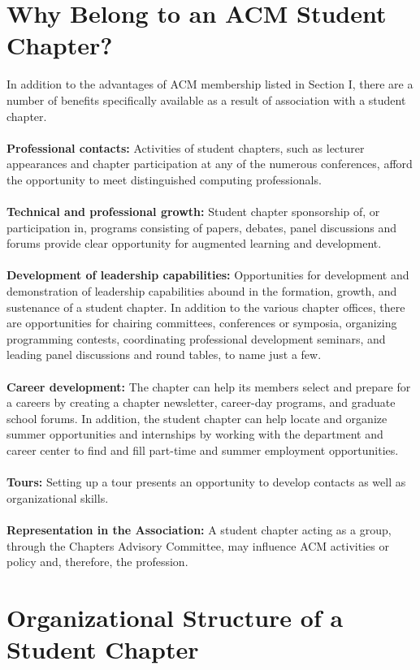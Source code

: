 \section{Why Belong to an ACM Student Chapter?}
\label{sec:sec05}
In addition to the advantages of ACM membership listed in Section I, there are
a number of benefits specifically available as a result of association with a
student chapter.\\
\\
\textbf{Professional contacts:} Activities of student chapters, such as lecturer
appearances and chapter participation at any of the numerous conferences, afford
the opportunity to meet distinguished computing professionals.\\
\\
\textbf{Technical and professional growth:} Student chapter sponsorship of, or
participation in, programs consisting of papers, debates, panel discussions and
forums provide clear opportunity for augmented learning and development.\\
\\
\textbf{Development of leadership capabilities:} Opportunities for development
and demonstration of leadership capabilities abound in the formation, growth,
and sustenance of a student chapter. In addition to the various chapter offices,
there are opportunities for chairing committees, conferences or symposia,
organizing programming contests, coordinating professional development seminars,
and leading panel discussions and round tables, to name just a few.\\
\\
\textbf{Career development:} The chapter can help its members select and prepare
for a careers by creating a chapter newsletter, career-day programs, and graduate
school forums. In addition, the student chapter can help locate and organize
summer opportunities and internships by working with the department and career
center to find and fill part-time and summer employment opportunities.\\
\\
\textbf{Tours:} Setting up a tour presents an opportunity to develop contacts
as well as organizational skills.\\
\\
\textbf{Representation in the Association:} A student chapter acting as a group,
through the Chapters Advisory Committee, may influence ACM activities or policy
and, therefore, the profession.

\section{Organizational Structure of a Student Chapter}
\label{sec:sec06}

